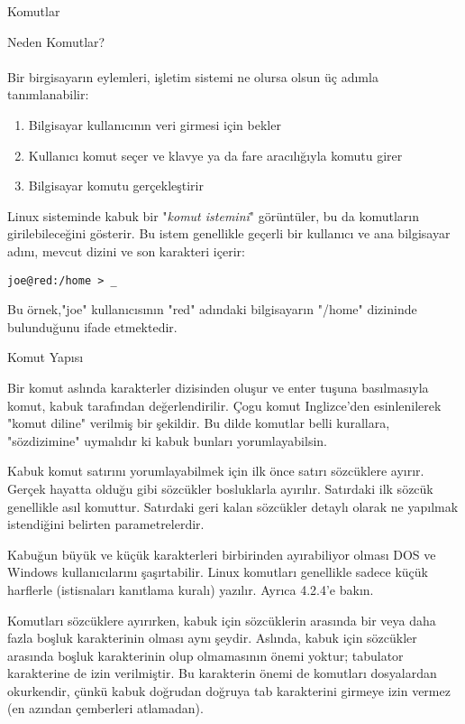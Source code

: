 \begin{section}{Komutlar}
\begin{subsection}{Neden Komutlar?}
\paragraph{}{Bir birgisayarın eylemleri, işletim sistemi ne olursa olsun üç adımla tanımlanabilir:
\begin{enumerate}
 \item Bilgisayar kullanıcının veri girmesi için bekler
 \item Kullanıcı komut seçer ve klavye ya da fare aracılığıyla komutu girer
 \item Bilgisayar komutu gerçekleştirir
\end{enumerate}}

Linux sisteminde kabuk bir "\emph{komut istemini}" görüntüler, bu da komutların girilebileceğini gösterir. Bu istem genellikle geçerli bir kullanıcı ve ana bilgisayar adını, mevcut dizini ve son karakteri içerir:
\begin{verbatim}joe@red:/home > _
\end{verbatim}

Bu örnek,"joe" kullanıcısının "red" adındaki bilgisayarın "/home" dizininde bulunduğunu ifade etmektedir.
\end{subsection}
\begin{subsection}{Komut Yapısı}

Bir komut aslında karakterler dizisinden oluşur ve enter tuşuna basılmasıyla komut, kabuk tarafından değerlendirilir. Çogu komut Inglizce'den esinlenilerek "komut diline" verilmiş bir şekildir. Bu dilde komutlar belli kurallara, "sözdizimine" uymalıdır ki kabuk bunları yorumlayabilsin.

Kabuk komut satırını yorumlayabilmek için ilk önce satırı sözcüklere ayırır. Gerçek hayatta olduğu gibi sözcükler bosluklarla ayırılır. Satırdaki ilk sözcük genellikle asıl komuttur. Satırdaki geri kalan sözcükler detaylı olarak ne yapılmak istendiğini belirten parametrelerdir.

Kabuğun büyük ve küçük karakterleri birbirinden ayırabiliyor olması DOS ve Windows kullanıcılarını şaşırtabilir. Linux komutları genellikle sadece küçük harflerle (istisnaları kanıtlama kuralı) yazılır. Ayrıca 4.2.4'e bakın.

Komutları sözcüklere ayırırken, kabuk için sözcüklerin arasında bir veya daha fazla boşluk karakterinin olması aynı şeydir. Aslında, kabuk için sözcükler arasında boşluk karakterinin olup olmamasının önemi yoktur; tabulator karakterine de izin verilmiştir. Bu karakterin önemi de komutları dosyalardan okurkendir, çünkü kabuk doğrudan doğruya tab karakterini girmeye izin vermez (en azından çemberleri atlamadan).


\end{subsection}
\end{section}
